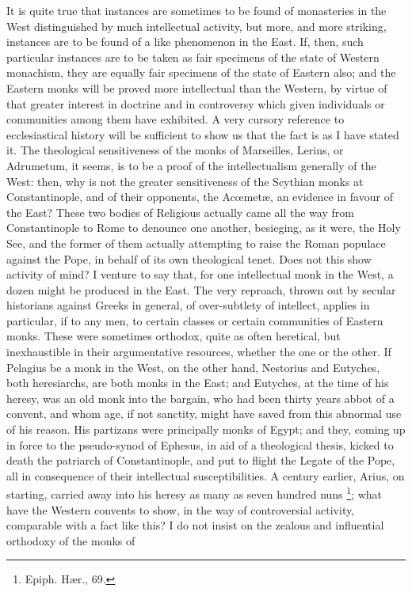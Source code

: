 It is quite true that instances are sometimes to be found of
monasteries in the West distinguished by much intellectual activity,
but more, and more striking, instances are to be found of a like
phenomenon in the East. If, then, such particular instances are to be
taken as fair specimens of the state of Western monachism, they are
equally fair specimens of the state of Eastern also; and the Eastern
monks will be proved more intellectual than the Western, by virtue of
that greater interest in doctrine and in controversy which given
individuals or communities among them have exhibited. A very cursory
reference to ecclesiastical history will be sufficient to show us that
the fact is as I have stated it. The theological sensitiveness of the
monks of Marseilles, Lerins, or Adrumetum, it seems, is to be a proof
of the intellectualism generally of the West: then, why is not
the greater sensitiveness of the Scythian monks at Constantinople, and
of their opponents, the Acœmetæ, an evidence in favour of the East?
These two bodies of Religious actually came all the way from
Constantinople to Rome to denounce one another, besieging, as it were,
the Holy See, and the former of them actually attempting to raise the
Roman populace against the Pope, in behalf of its own theological
tenet. Does not this show activity of mind? I venture to say that, for
one intellectual monk in the West, a dozen might be produced in the
East. The very reproach, thrown out by secular historians against
Greeks in general, of over-subtlety of intellect, applies in
particular, if to any men, to certain classes or certain communities
of Eastern monks. These were sometimes orthodox, quite as often
heretical, but inexhaustible in their argumentative resources, whether
the one or the other. If Pelagius be a monk in the West, on the other
hand, Nestorius and Eutyches, both heresiarchs, are both monks in the
East; and Eutyches, at the time of his heresy, was an old monk into
the bargain, who had been thirty years abbot of a convent, and whom
age, if not sanctity, might have saved from this abnormal use of his
reason. His partizans were principally monks of Egypt; and they,
coming up in force to the pseudo-synod of Ephesus, in aid of a
theological thesis, kicked to death the patriarch of Constantinople,
and put to flight the Legate of the Pope, all in consequence of their
intellectual susceptibilities. A century earlier, Arius, on starting,
carried away into his heresy as many as seven hundred nuns \footnote{Epiph. Hær.,
69.}; what have the Western convents to show, in the way of
controversial activity, comparable with a fact like this? I do not insist on the zealous and influential orthodoxy of the monks of
